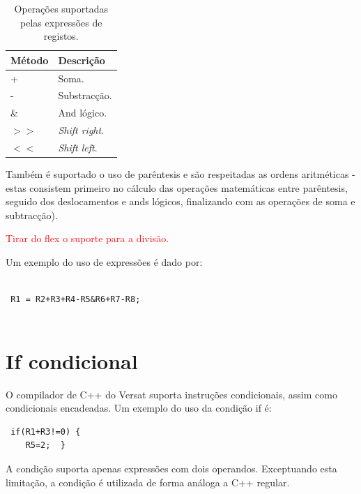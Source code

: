 \begin{table}[h!]
    \caption[Operações suportadas pelas expressões de registos.]{Operações suportadas pelas expressões de registos.}
  \begin{center}
    \begin{tabular}{|l|L{5cm}|}
      \hline
       {\bf Método} & {\bf Descrição} \\
      \hline \hline
      + & Soma. \\
      - & Substracção. \\
      \& & And lógico. \\
      $>>$ & {\it Shift right}. \\
      $<<$ & {\it Shift left}. \\
      \hline
    \end{tabular}
  \end{center}
  \label{tab:instrControlador}
\end{table}

Também é suportado o uso de parêntesis e são respeitadas as ordens aritméticas - estas consistem primeiro no cálculo das operações matemáticas entre parêntesis, seguido dos deslocamentos e ands lógicos, finalizando com as operações de soma e subtracção).

\textcolor{red}{Tirar do flex o suporte para a divisão.}

Um exemplo do uso de expressões é dado por:

\begin{lstlisting}
 
 R1 = R2+R3+R4-R5&R6+R7-R8;
 
\end{lstlisting}

\section{If condicional}
\label{section:if condicional}

O compilador de C++ do Versat suporta instruções condicionais, assim como condicionais encadeadas. Um exemplo do uso da condição if é:

\begin{lstlisting}
 if(R1+R3!=0) {
	R5=2;  }
\end{lstlisting}

A condição suporta apenas expressões com dois operandos. Exceptuando esta limitação, a condição é utilizada de forma análoga a C++ regular.

